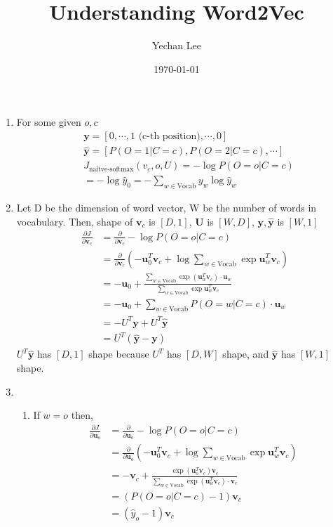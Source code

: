 \documentclass{amsart}
\theoremstyle{plain}
\theoremstyle{remark}
\numberwithin{equation}{section}
\begin{document}
\title{Understanding Word2Vec}
\author{Yechan Lee}
\date{\today}

\maketitle

\begin{enumerate}
\item For some given $o, c$
\[ 
\begin{split}
& \mathbf{y} = [0, \cdots, 1  \text{ (c-th position)}, \cdots, 0] \\
& \mathbf{\hat y} = [P(O=1|C=c), P(O=2|C=c), \cdots ] \\ 
& J_{\text{naitve-softmax}}(v_c, o, U) = -\log P(O=o|C=c) \\
& = - \log \hat y_0 = -\sum_{w \in \text{Vocab}} y_w \log \hat y_w 
\end{split}
\]


\item Let D be the dimension of word vector, W be the number of words in vocabulary. Then, shape of $\mathbf v_c$ is $[D, 1]$, $\mathbf U$ is $[W, D]$, $\mathbf y, \mathbf {\hat y}$ is $[W, 1]$ 
\[
\begin{split}
\frac {\partial J} {\partial \mathbf v_c} & = \frac \partial {\partial \mathbf v_c} -\log P(O=o|C=c) \\
& = \frac \partial {\partial \mathbf v_c} \left ( - \mathbf u_0^T \mathbf v_c +\log \sum_{w\in \text{Vocab}} \exp {\mathbf u}_w^T \mathbf v_c \right ) \\
& = - \mathbf u_0 + \frac { \sum_{w \in \text{Vocab}} \exp \left (\mathbf u_w^T \mathbf v_c \right ) \cdot \mathbf u_w } { \sum_{w\in \text{Vocab}} \exp \mathbf u_w^T \mathbf v_c } \\
& = -\mathbf u_0 +\sum_{w\in\text{Vocab}} P(O=w|C=c) \cdot \mathbf u_w \\
& = - U^T \mathbf y + U^T \hat {\mathbf y} \\ 
& = U^T (\mathbf {\hat y} - \mathbf y) 
\end{split}
\]
$U^T \mathbf {\hat y}$ has $[D, 1]$ shape because $U^T$ has $[D, W]$ shape, and $\mathbf {\hat y}$ has $[W, 1]$ shape.


\item \,
\begin{enumerate}
\item If $w=o$ then, 
\[
\begin{split}
\frac {\partial J} {\partial \mathbf u_o} &= \frac \partial {\partial \mathbf u_o} -\log P(O=o|C=c) \\
&= \frac \partial {\partial \mathbf u_o} \left ( - \mathbf u_0^T \mathbf v_c +\log \sum_{w\in \text{Vocab}} \exp {\mathbf u}_w^T \mathbf v_c \right ) \\
&= - \mathbf v_c + \frac { \exp \left ( \mathbf u_o^T \mathbf v_c \right ) \mathbf v_c} { \sum_{w \in \text{Vocab}} \exp \left (\mathbf u_w^T \mathbf v_c \right ) \cdot \mathbf v_c }  \\
&= (P(O=o|C=c)-1)\mathbf v_c \\
& = (\hat y_o -1) \mathbf v_c
\end{split}
\]


\end{enumerate}
\end{enumerate}
\end{document}

